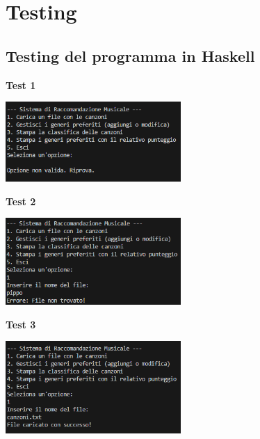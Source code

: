 \documentclass[a4paper,11pt]{article}
\begin{document}
\newpage
\section{Testing}
\subsection{Testing del programma in Haskell}
\begin{center}
    \textbf{Test 1}
    \par
    \vspace{0.5cm}
    \includegraphics[width=0.5\textwidth]{htest1}
\end{center}
\begin{center}
    \textbf{Test 2}
    \par
    \vspace{0.5cm}
    \includegraphics[width=0.5\textwidth]{htest2}
\end{center}
\begin{center}
    \textbf{Test 3}
    \par
    \vspace{0.5cm}
    \includegraphics[width=0.5\textwidth]{htest3}
\end{center}
\end{document}
